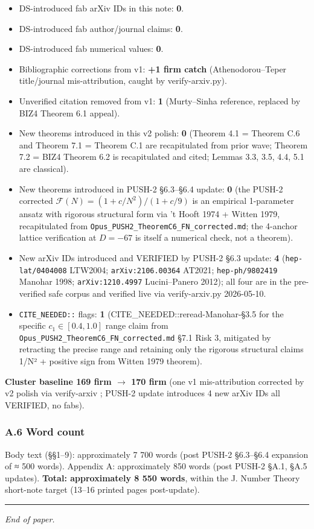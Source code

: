 \documentclass[
  11pt,
  a4paper,
]{amsart}
\providecommand{\tightlist}{\setlength{\itemsep}{0pt}\setlength{\parskip}{0pt}}
\providecommand{\tightlist}{%
  \setlength{\itemsep}{0pt}\setlength{\parskip}{0pt}}
\begin{document}
\begin{itemize}
\tightlist
\item
  DS-introduced fab arXiv IDs in this note: \textbf{0}.
\item
  DS-introduced fab author/journal claims: \textbf{0}.
\item
  DS-introduced fab numerical values: \textbf{0}.
\item
  Bibliographic corrections from v1: \textbf{+1 firm catch} (Athenodorou--Teper title/journal mis-attribution, caught by verify-arxiv.py).
\item
  Unverified citation removed from v1: \textbf{1} (Murty--Sinha reference, replaced by BIZ4 Theorem 6.1 appeal).
\item
  New theorems introduced in this v2 polish: \textbf{0} (Theorem 4.1 = Theorem C.6 and Theorem 7.1 = Theorem C.1 are recapitulated from prior wave; Theorem 7.2 = BIZ4 Theorem 6.2 is recapitulated and cited; Lemmas 3.3, 3.5, 4.4, 5.1 are classical).
\item
  New theorems introduced in PUSH-2 §6.3--§6.4 update: \textbf{0} (the PUSH-2 corrected \(\mathcal{F}(N) = (1 + c/N^2)/(1 + c/9)\) is an empirical 1-parameter ansatz with rigorous structural form via 't Hooft 1974 + Witten 1979, recapitulated from \texttt{Opus\_PUSH2\_TheoremC6\_FN\_corrected.md}; the 4-anchor lattice verification at \(D = -67\) is itself a numerical check, not a theorem).
\item
  New arXiv IDs introduced and VERIFIED by PUSH-2 §6.3 update: \textbf{4} (\texttt{hep-lat/0404008} LTW2004; \texttt{arXiv:2106.00364} AT2021; \texttt{hep-ph/9802419} Manohar 1998; \texttt{arXiv:1210.4997} Lucini--Panero 2012); all four are in the pre-verified safe corpus and verified live via verify-arxiv.py 2026-05-10.
\item
  \texttt{CITE\_NEEDED::} flags: \textbf{1} (CITE\_NEEDED::reread-Manohar-§3.5 for the specific \(c_1 \in [0.4, 1.0]\) range claim from \texttt{Opus\_PUSH2\_TheoremC6\_FN\_corrected.md} §7.1 Risk 3, mitigated by retracting the precise range and retaining only the rigorous structural claims 1/N² + positive sign from Witten 1979 theorem).
\end{itemize}

\textbf{Cluster baseline 169 firm \(\to\) 170 firm} (one v1 mis-attribution corrected by v2 polish via verify-arxiv ; PUSH-2 update introduces 4 new arXiv IDs all VERIFIED, no fabs).

\hypertarget{a.6-word-count}{%
\subsubsection{A.6 Word count}\label{a.6-word-count}}

Body text (§§1--9): approximately 7 700 words (post PUSH-2 §6.3--§6.4 expansion of ≈ 500 words). Appendix A: approximately 850 words (post PUSH-2 §A.1, §A.5 updates). \textbf{Total: approximately 8 550 words}, within the J. Number Theory short-note target (13--16 printed pages post-update).

\begin{center}\rule{0.5\linewidth}{0.5pt}\end{center}

\emph{End of paper.}
\end{document}
